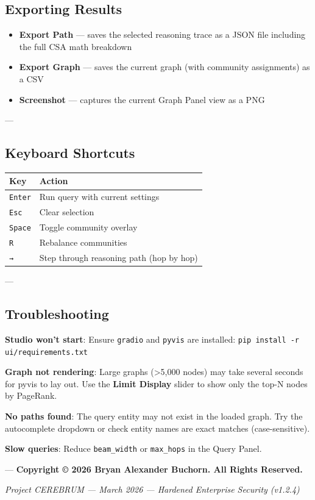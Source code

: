 \documentclass[11pt,article,oneside]{memoir}
\begin{document}
\subsection{Exporting Results}

\begin{itemize}
\item \textbf{Export Path} — saves the selected reasoning trace as a JSON file including the full CSA math breakdown
\item \textbf{Export Graph} — saves the current graph (with community assignments) as a CSV
\item \textbf{Screenshot} — captures the current Graph Panel view as a PNG

\end{itemize}
---

\subsection{Keyboard Shortcuts}

\begin{center}
\begin{tabularx}{\columnwidth}{|>{\raggedright\arraybackslash}X|>{\raggedright\arraybackslash}X|}
\hline
Key & Action \\ \hline
\texttt{Enter} & Run query with current settings \\ \hline
\texttt{Esc} & Clear selection \\ \hline
\texttt{Space} & Toggle community overlay \\ \hline
\texttt{R} & Rebalance communities \\ \hline
\texttt{→} & Step through reasoning path (hop by hop) \\ \hline
\end{tabularx}
\end{center}

---

\subsection{Troubl\-eshooting}

\textbf{Studio won't start}: Ensure \texttt{gradio} and \texttt{pyvis} are installed: \texttt{pip install -r ui/requirements.txt}

\textbf{Graph not rendering}: Large graphs (\textgreater 5,000 nodes) may take several seconds for pyvis to lay out. Use the \textbf{Limit Display} slider to show only the top-N nodes by PageRank.

\textbf{No paths found}: The query entity may not exist in the loaded graph. Try the autoc\-omplete dropdown or check entity names are exact matches (case-sensitive).

\textbf{Slow queries}: Reduce \texttt{beam\_width} or \texttt{max\_hops} in the Query Panel.

---
\textbf{Copyright © 2026 Bryan Alexander Buchorn. All Rights Reserved.}


\vspace{3em}
\begin{center}
    \small \textit{Project CEREBRUM — March 2026 — Hardened Enterprise Security (v1.2.4)}
\end{center}
\end{document}
